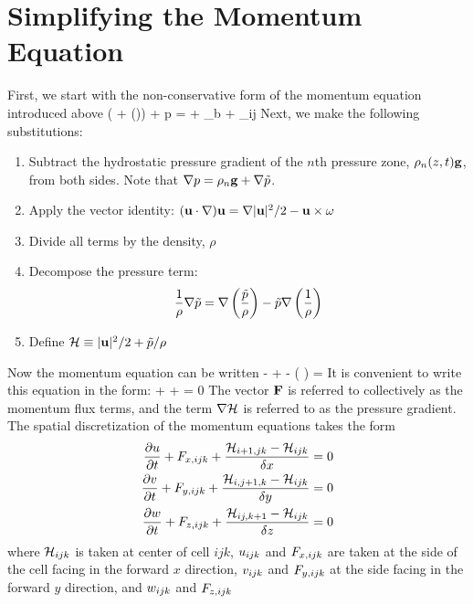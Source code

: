 \newpage

\section{Simplifying the Momentum Equation}

First, we start with the non-conservative form of the momentum equation introduced above
\be \rho \left(  + (\bu \cdot \nabla)\bu  \right) + \nabla p = \rho \bg + \bof_b + \nabla\!\cdot \btau_{ij}  \label{momentum} \ee
Next, we make the following substitutions:
\begin{enumerate}
\item Subtract the hydrostatic pressure gradient of the $n$th pressure zone, $\rho_n(z,t) {\bf g}$, from both sides. Note that
$\nabla p=\rho_n {\bf g} + \nabla \tilde{p}$.
\item Apply the vector identity: $({\bf u} \cdot \nabla) {\bf u} = \nabla|{\bf u}|^2/2 - {\bf u}\times{\bf \omega} $
\item Divide all terms by the density, $\rho$
\item Decompose the pressure term:
   $$ \frac{1}{\rho} \nabla \tilde{p} = \nabla \left( \frac{\tilde{p}}{\rho}\right) - \tilde{p} \nabla \left(\frac{1}{\rho} \right)  $$
\item Define ${\cal H} \equiv |{\bf u}|^2/2 + \tilde{p}/\rho $
\end{enumerate}
Now the momentum equation can be written
\be {} - \bu\times\bo +  - \tp \nabla \left( \right) =    \label{momeq} \ee
It is convenient to write this equation in the form:
\be {} + \bF + \nabla \cH = 0 \label{simple_momentum_equation} \ee
The vector ${\bf F}$ is referred to collectively as the momentum flux terms, and the term $\nabla {\cal H}$ is referred to as the
pressure gradient. The spatial discretization of the momentum equations takes the form
\begin{eqnarray}
\frac{\partial u}{\partial t} + F_{x,ijk} + \frac{{\cal H}_{i+1,jk} -{\cal H}_{ijk}}{\delta x} = 0  \label{umom} \\
\frac{\partial v}{\partial t} + F_{y,ijk} + \frac{{\cal H}_{i,j+1,k}-{\cal H}_{ijk}}{\delta y} = 0  \label{vmom} \\
\frac{\partial w}{\partial t} + F_{z,ijk} + \frac{{\cal H}_{ij,k+1} -{\cal H}_{ijk}}{\delta z} = 0  \label{wmom}
\end{eqnarray}
where ${\cal H}_{ijk}$ is taken at center of cell $ijk$,
$u_{ijk}$ and $F_{x,ijk}$ are taken at the side of the cell facing
in the forward $x$ direction, $v_{ijk}$ and $F_{y,ijk}$ at the side
facing in the forward $y$ direction, and $w_{ijk}$ and $F_{z,ijk}$
